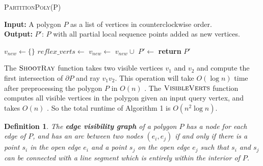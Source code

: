\documentclass[]{article}
\newtheorem{definition}{Definition}
\begin{document}
\begin{algorithm}
\caption{\textsc{PartitionPoly}(P)}
\label{algo:insert}
\hspace*{\algorithmicindent} \textbf{Input:} A polygon $P$ as a list of
vertices in counterclockwise order.\\
\hspace*{\algorithmicindent} \textbf{Output:} $P'$: $P$ with
all partial local sequence points added as new vertices.
\begin{algorithmic}[1]
\State $v_{new} \gets \{\}$
\State $reflex\_verts \gets$ 
        \State $v_{new} \gets$ $v_{new} \cup$ 
    \EndFor
\EndFor
\State $P' \gets$ 
\State \textbf{return} $P'$
\end{algorithmic}
\end{algorithm}

The $\textsc{ShootRay}$ function takes two visible vertices $v_{1}$ and $v_{2}$
and compute the first intersection of $\partial P$ and ray $v_{1}v_{2}$. This
operation will take $O(\log n)$ time after preprocessing the polygon $P$ in
$O(n)$ \cite{Szirmay-Kalos:1998:WVA:297217.297219}. The $\textsc{VisibleVerts}$
function computes all visible vertices in the polygon given an input query
vertex, and takes $O(n)$ \cite{ElGindy1981ALA}. So the total runtime of
Algorithm 1 is $O(n^2\log n)$.

\begin{definition}
The \textbf{edge visibility graph} of a polygon $P$ has a node for each edge of
$P$, and has an arc between two nodes $(e_i, e_j)$ if and only if there is a
point $s_i$ in the open edge $e_i$ and a point $s_j$ on the open edge $e_j$ such
that $s_i$ and $s_j$ can be connected with a line segment which is entirely
within the interior of $P$.
\end{definition}

%
%
%
\end{document}
